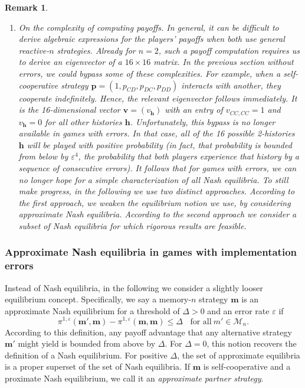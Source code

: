 \documentclass[9pt,twoside,lineno]{pnas-new}
\theoremstyle{plainCl1}
\theoremstyle{plainCl2}
\newtheorem{remark}{Remark}
\begin{document}
\begin{remark}
\begin{enumerate}[label=({\it \roman*})]
\item {\it On the complexity of computing payoffs.} 
In general, it can be difficult to derive algebraic expressions for the players' payoffs when both use general reactive-$n$ strategies. 
Already for $n\!=\!2$, such a payoff computation requires us to derive an eigenvector of a $16\!\times\!16$ matrix.
In the previous section without errors, we could bypass some of these complexities. 
For example, when a self-cooperative strategy $\mathbf{p}=(1,p_{CD},p_{DC}, p_{DD})$ interacts with another, they cooperate indefinitely.
Hence, the relevant eigenvector follows immediately. 
It is the 16-dimensional vector $\mathbf{v}=(v_\mathbf{h})$ with an entry of $v_{CC,CC}\!=\!1$ and $v_\mathbf{h}\!=\!0$ for all other histories $\mathbf{h}$. 
Unfortunately, this bypass is no longer available in games with errors. 
In that case, all of the 16 possible 2-histories $\mathbf{h}$ will be played with positive probability (in fact, that probability is bounded from below by $\varepsilon^4$, the probability that both players experience that history by a sequence of consecutive errors). 
It follows that for games with errors, we can no longer hope for a simple characterization of all Nash equilibria.  
To still make progress, in the following we use two distinct approaches. 
According to the first approach, we weaken the equilibrium notion we use, by considering approximate Nash equilibria.  
According to the second approach we consider a subset of Nash equilibria for which rigorous results are feasible. 
\end{enumerate} 
\end{remark}

\subsubsection*{Approximate Nash equilibria in games with implementation errors}

Instead of Nash equilibria, in the following we consider a slightly looser equilibrium concept. 
Specifically, we say a memory-$n$ strategy $\mathbf{m}$ is an approximate Nash equilibrium for a threshold of $\Delta\!>\!0$ and an error rate $\varepsilon$ if 
\begin{equation} \label{Eq:ApproximateNash}
\pi^{1,\varepsilon}(\mathbf{m'},\mathbf{m}) - \pi^{1,\varepsilon}(\mathbf{m},\mathbf{m}) \le \Delta~~~~\text{for all}~m'\in\mathcal{M}_n.
\end{equation}
According to this definition, any payoff advantage that any alternative strategy $\mathbf{m}'$ might yield is bounded from above by $\Delta$. 
For $\Delta\!=\!0$, this notion recovers the definition of a Nash equilibrium. 
For positive $\Delta$, the set of approximate equilibria is a proper superset of the set of Nash equilibria. 
If $\mathbf{m}$ is self-cooperative and a proximate Nash equilibrium, we call it an {\it approximate partner strategy}. 
\end{document}
